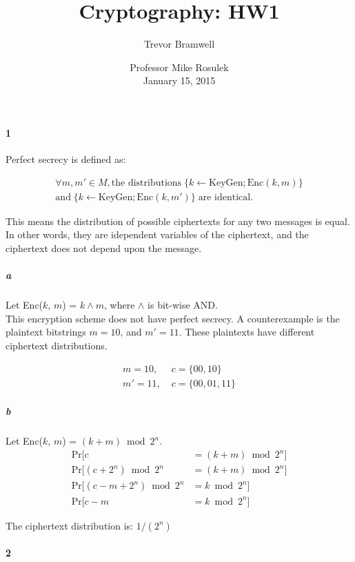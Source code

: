 \documentclass[12pt]{article}
\title{Cryptography: HW1}
\author{Trevor Bramwell}
\date{
    Professor Mike Rosulek\\
    January 15, 2015
}
\begin{document}
\maketitle


\paragraph{1} Perfect secrecy is defined as:

\begin{gather*}
    \forall m, m' \in M, \text{the distributions} \;
    \{k \gets \text{KeyGen}; \text{Enc}(k,m)\}\\ \text{and} \; \{k \gets
    \text{KeyGen}; \text{Enc}(k, m')\}
    \; \text{are identical.}
\end{gather*}

This means the distribution of possible ciphertexts for any two messages
is equal.  In other words, they are idependent variables of the
ciphertext, and the ciphertext does not depend upon the message.

\subparagraph{a}

    Let Enc($k$, $m$) = $k \wedge m$, where $\wedge$ is bit-wise AND.\\

    This encryption scheme does not have perfect secrecy. A
    counterexample is the plaintext bitstrings $m = 10$, and $m' = 11$.
    These plaintexts have different ciphertext distributions.

    \begin{align*}
        m = 10,\; &c = \{00, 10\} \\
        m' = 11,\; &c = \{00, 01, 11\}
    \end{align*}

\subparagraph{b}

    Let Enc($k$, $m$) = $(k + m) \bmod 2^n$.\\
    
    \begin{align*}
        \text{Pr}[c &= (k + m) \bmod 2^n]\\
        \text{Pr}[(c + 2^n) \bmod 2^n &= (k + m) \bmod 2^n]\\
        \text{Pr}[(c - m + 2^n) \bmod 2^n &= k \bmod 2^n]\\
        \text{Pr}[c - m &= k \bmod 2^n]
    \end{align*}

    The ciphertext distribution is: $1/(2^n)$

\paragraph{2}
\end{document}
